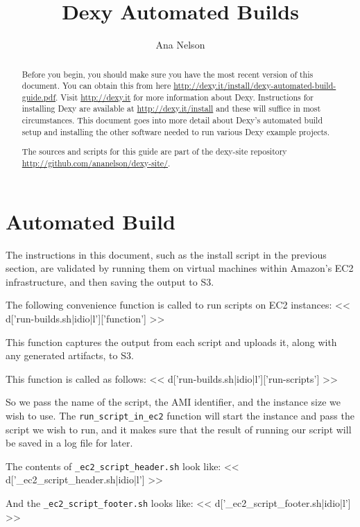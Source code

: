 \documentclass{tufte-handout}
\title{Dexy Automated Builds}
\author{Ana Nelson}
\begin{document}
\maketitle

\begin{abstract}
Before you begin, you should make sure you have the most recent version of this document. You can obtain this from here \url{http://dexy.it/install/dexy-automated-build-guide.pdf}. Visit \url{http://dexy.it} for more information about Dexy. Instructions for installing Dexy are available at \url{http://dexy.it/install} and these will suffice in most circumstances. This document goes into more detail about Dexy's automated build setup and installing the other software needed to run various Dexy example projects.

The sources and scripts for this guide are part of the dexy-site repository \url{http://github.com/ananelson/dexy-site/}.

\end{abstract}

\section{Automated Build}

The instructions in this document, such as the install script in the previous section, are validated by running them on virtual machines within Amazon's EC2 infrastructure, and then saving the output to S3.

\noindent The following convenience function is called to run scripts on EC2 instances:
<< d['run-builds.sh|idio|l']['function'] >>

This function captures the output from each script and uploads it, along with any generated artifacts, to S3.

\noindent This function is called as follows:
<< d['run-builds.sh|idio|l']['run-scripts'] >>

So we pass the name of the script, the AMI identifier, and the instance size we
wish to use. The \verb=run_script_in_ec2= function will start the instance and
pass the script we wish to run, and it makes sure that the result of running
our script will be saved in a log file for later.

The contents of \verb=_ec2_script_header.sh= look like:
<< d['_ec2_script_header.sh|idio|l'] >>

And the \verb=_ec2_script_footer.sh= looks like:
<< d['_ec2_script_footer.sh|idio|l'] >>
\end{document}

